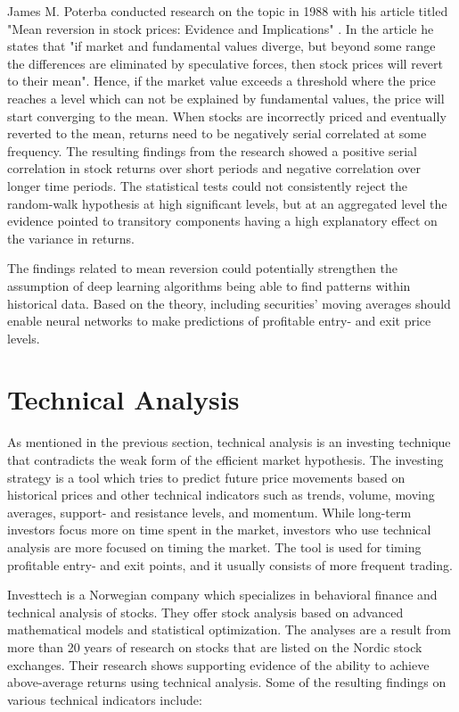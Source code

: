 \indent \newline 
James M. Poterba conducted research on the topic in 1988 with his article titled "Mean reversion in stock prices: Evidence and Implications" \cite{poterba}. In the article he states that "if market and fundamental values diverge, but beyond some range the differences are eliminated by speculative forces, then stock prices will revert to their mean". Hence, if the market value exceeds a threshold where the price reaches a level which can not be explained by fundamental values, the price will start converging to the mean. When stocks are incorrectly priced and eventually reverted to the mean, returns need to be negatively serial correlated at some frequency. The resulting findings from the research showed a positive serial correlation in stock returns over short periods and negative correlation over longer time periods. The statistical tests could not consistently reject the random-walk hypothesis at high significant levels, but at an aggregated level the evidence pointed to transitory components having a high explanatory effect on the variance in returns.    

\indent \newline 
The findings related to mean reversion could potentially strengthen the assumption of deep learning algorithms being able to find patterns within historical data. Based on the theory, including securities' moving averages should enable neural networks to make predictions of profitable entry- and exit price levels.  

\section{Technical Analysis}
As mentioned in the previous section, technical analysis is an investing technique that contradicts the weak form of the efficient market hypothesis. The investing strategy is a tool which tries to predict future price movements based on historical prices and other technical indicators such as trends, volume, moving averages, support- and resistance levels, and momentum. While long-term investors focus more on time spent in the market, investors who use technical analysis are more focused on timing the market. The tool is used for timing profitable entry- and exit points, and it usually consists of more frequent trading.   

\indent \newline 
Investtech is a Norwegian company which specializes in behavioral finance and technical analysis of stocks. They offer stock analysis based on advanced mathematical models and statistical optimization. The analyses are a result from more than 20 years of research on stocks that are listed on the Nordic stock exchanges. Their research shows supporting evidence of the ability to achieve above-average returns using technical analysis. Some of the resulting findings on various technical indicators include:

